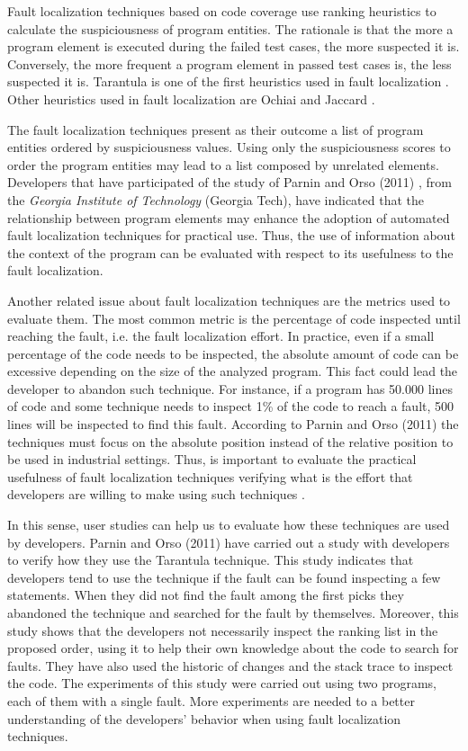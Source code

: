 \documentclass[12pt,a4paper,espaco=umemeio,noindentfirst,oneside,openany,tocpage=plain,pnumromarab,ruledheader,time,anapcustomindent]{sty/abnt}
\begin{document}
Fault localization techniques based on code coverage use ranking heuristics to calculate the suspiciousness of program entities.
The rationale is that the more a program element is executed during the failed test cases, the more suspected it is. Conversely, 
the more frequent a program element in passed test cases is, the less suspected it is. Tarantula is one of the first heuristics 
used in fault localization \cite{jones2002}. Other heuristics used in fault localization are Ochiai and Jaccard \cite{abreu2007}.

The fault localization techniques present as their outcome a list of program entities ordered by suspiciousness values. Using 
only the suspiciousness scores to order the program entities may lead to a list composed by unrelated elements. Developers that have
participated of the study of Parnin and Orso (2011) \cite{parnin2011}, from the \textit{Georgia  Institute of Technology} (Georgia Tech), have indicated that the 
relationship between program elements may enhance the adoption of automated fault localization techniques for practical use.
Thus, the use of information about the context of the program can be evaluated with respect to its usefulness to the fault 
localization.

Another related issue about fault localization techniques are the metrics used to evaluate them. The most common metric is the 
percentage of code inspected until reaching the fault, i.e. the fault localization effort. In practice, even if a small percentage 
of the code needs to be inspected, the absolute amount of code can be excessive depending on the size of the analyzed program. This fact 
could lead the developer to abandon such technique. For instance, if a program has 50.000 lines of code and some technique 
needs to inspect 1\% of the code to reach a fault, 500 lines will be inspected to find this fault. According to Parnin and Orso (2011)
\cite{parnin2011} the techniques must focus on the absolute position instead of the relative position to be used in industrial settings.
Thus, is important to evaluate the practical usefulness of fault localization techniques verifying what is the effort that developers 
are willing to make using such techniques .
	
In this sense, user studies can help us to evaluate how these techniques are used by developers. Parnin and Orso (2011) \cite{parnin2011} 
have carried out a study with developers to verify how they use the Tarantula technique. This study indicates that developers tend to 
use the technique if the fault can be found inspecting a few statements. When they did not find the fault among the first picks 
they abandoned the technique and searched for the fault by themselves. Moreover, this study shows that the developers not necessarily 
inspect the ranking list in the proposed order, using it to help their own knowledge about the code to search for faults. They have also used
the historic of changes and the stack trace to inspect the code.
The experiments of this study were carried out using two programs, each of them with a single fault. More experiments are needed to 
a better understanding of the developers' behavior when using fault localization techniques. 
\end{document}
